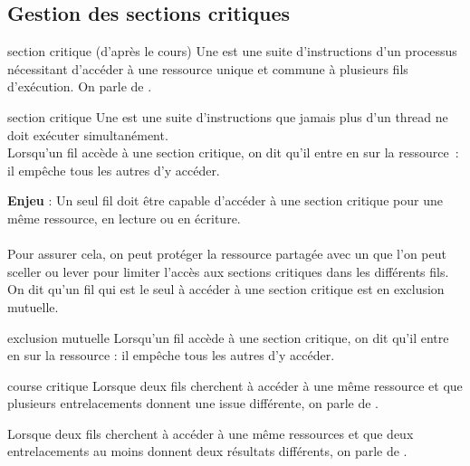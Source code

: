 \begin{adjustwidth}{-3cm}{-3cm}
\subsection{Gestion des sections critiques}

\begin{definition}{}{section critique (d'après le cours)}
    Une  est une suite d'instructions d'un processus nécessitant d'accéder à une ressource unique et commune à plusieurs fils d'exécution. On parle de .
\end{definition}

\begin{definition}{}{section critique}
    Une  est une suite d'instructions que jamais plus d'un thread ne doit exécuter simultanément.\\
    Lorsqu'un fil accède à une section critique, on dit qu'il entre en  sur la ressource~: il empêche tous les autres d'y accéder.
\end{definition}

\textbf{Enjeu} : Un seul fil doit être capable d'accéder à une section critique pour une même ressource, en lecture ou en écriture. \\\\

Pour assurer cela, on peut protéger la ressource partagée avec un  que l'on peut sceller ou lever pour limiter l'accès aux sections critiques dans les différents fils. On dit qu'un fil qui est le seul à accéder à une section critique est en exclusion mutuelle.

\begin{definition}{}{exclusion mutuelle}
    Lorsqu'un fil accède à une section critique, on dit qu'il entre en  sur la ressource : il empêche tous les autres d'y accéder.
\end{definition}

\begin{definition}{}{course critique}
    Lorsque deux fils cherchent à accéder à une même ressource et que plusieurs entrelacements donnent une issue différente, on parle de .
\end{definition}

Lorsque deux fils cherchent à accéder à une même ressources et que deux entrelacements au moins donnent deux résultats différents, on parle de .


\end{adjustwidth}

